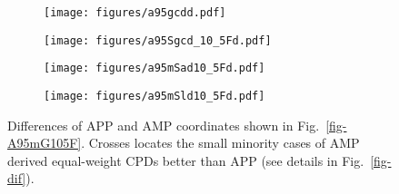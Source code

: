 \begin{figure}
\captionsetup[subfigure]{singlelinecheck=off,justification=raggedright,aboveskip=-6pt,belowskip=-6pt}
\centering
  \begin{subfigure}[htbp]{.49\textwidth}
	\caption{}\texttt{[image: figures/a95gcdd.pdf]}\label{fig-A95GCD105Fd}
  \end{subfigure}
  \begin{subfigure}[htbp]{.49\textwidth}
	\caption{}\texttt{[image: figures/a95Sgcd\_10\_5Fd.pdf]}\label{fig-A95SGCD105Fd}
  \end{subfigure}
  \begin{subfigure}[htbp]{.49\textwidth}
	\caption{}\texttt{[image: figures/a95mSad10\_5Fd.pdf]}\label{fig-A95mSad105Fd}
  \end{subfigure}
  \begin{subfigure}[htbp]{.49\textwidth}
	\caption{}\texttt{[image: figures/a95mSld10\_5Fd.pdf]}\label{fig-A95mSld105Fd}
  \end{subfigure}
\caption[APP spatially better than AMP]{Differences of APP and AMP coordinates
shown in Fig.~\ref{fig-A95mG105F}. Crosses locates the small minority cases of
AMP derived equal-weight CPDs better than APP (see details in
Fig.~\ref{fig-dif}).}\label{fig-A95mG105Fd}
\end{figure}

